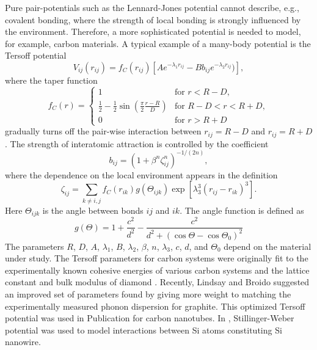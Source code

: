 Pure pair-potentials such as the Lennard-Jones potential cannot describe, e.g., covalent bonding, where the strength of local bonding is strongly influenced by the environment. Therefore, a more sophisticated potential is needed to model, for example, carbon materials. A typical example of a many-body potential is the Tersoff potential \cite{tersoff88b}
\begin{equation}
 V_{ij}(r_{ij}) = f_C(r_{ij}) \left[A e^{-\lambda_1 r_{ij}} - B b_{ij} e^{-\lambda_2 r_{ij}}) \right],
\end{equation}
where the taper function 
\begin{equation}
 f_C ( r) = \left\{ \begin{array}{ll}
                     1 & \textrm{for } r<R-D,\\
		     \frac{1}{2}-\frac{1}{2}\sin\left(\frac{\pi}{2}\frac{r-R}{D} \right) & \textrm{for } R-D < r < R+D, \\
		     0 & \textrm{for } r>R+D
                    \end{array}
 \right.
\end{equation}
gradually turns off the pair-wise interaction between $r_{ij}=R-D$ and $r_{ij}=R+D$. The strength of interatomic attraction is controlled by the coefficient
\begin{equation}
 b_{ij} = \left( 1+\beta^n \zeta_{ij}^n \right)^{-1/(2n)},
\end{equation}
where the dependence on the local environment appears in the definition 
\begin{equation}
 \zeta_{ij} = \sum_{k\neq i,j} f_C(r_{ik}) g(\Theta_{ijk}) \exp\left[\lambda_3^3(r_{ij}-r_{ik})^3 \right] .
\end{equation}
Here $\Theta_{ijk}$ is the angle between bonds $ij$ and $ik$. The angle function is defined as 
\begin{equation}
 g(\Theta) = 1 + \frac{c^2}{d^2} - \frac{c^2}{d^2 + (\cos \Theta-\cos \Theta_0)^2}
\end{equation}
The parameters $R$, $D$, $A$, $\lambda_1$, $B$, $\lambda_2$, $\beta$, $n$, $\lambda_3$, $c$, $d$, and $\Theta_0$ depend on the material under study. The Tersoff parameters for carbon systems were originally fit to the experimentally known cohesive energies of various carbon systems and the lattice constant and bulk modulus of diamond \cite{tersoff88a}. Recently, Lindsay and Broido \cite{lindsay10} suggested an improved set of parameters found by giving more weight to matching the experimentally measured phonon dispersion for graphite. This optimized Tersoff potential was used in Publication  for carbon nanotubes. In , Stillinger-Weber potential \cite{stillinger85} was used to model interactions between Si atoms constituting Si nanowire. 





